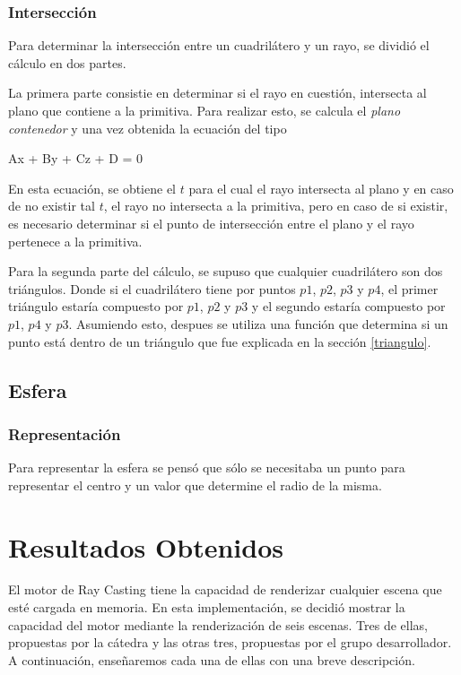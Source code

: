 \documentclass[a4paper,10pt]{article}
\begin{document}
\subsubsection{Intersecci\'on}
Para determinar la intersecci\'on entre un cuadril\'atero y un rayo, se dividi\'o el c\'alculo en dos partes.

La primera parte consistie en determinar si el rayo en cuesti\'on, intersecta al plano que contiene a la primitiva.  Para realizar esto, se calcula el \emph{plano contenedor} y una vez obtenida la ecuaci\'on del tipo

 \begin{center}
 Ax + By + Cz + D = 0
\end{center}

En esta ecuaci\'on, se obtiene el $t$ para el cual el rayo intersecta al plano y en caso de no existir tal $t$, el rayo no intersecta a la primitiva, pero en caso de si existir, es necesario determinar si el punto de intersecci\'on entre el plano y el rayo pertenece a la primitiva.

Para la segunda parte del c\'alculo, se supuso que cualquier cuadril\'atero son dos tri\'angulos.  Donde si el cuadril\'atero tiene por puntos $p1$, $p2$, $p3$ y $p4$, el primer tri\'angulo estar\'ia compuesto por $p1$, $p2$ y $p3$ y el segundo estar\'ia compuesto por $p1$, $p4$ y $p3$.
Asumiendo esto, despues se utiliza una funci\'on que determina si un punto est\'a dentro de un tri\'angulo que fue explicada en la secci\'on \ref{triangulo}.

\subsection{Esfera}

\subsubsection{Representaci\'on}

Para representar la esfera se pens\'o que s\'olo se necesitaba un punto para representar el centro y un valor que determine el radio de la misma.



\section{Resultados Obtenidos}
\label{escenas}
El motor de Ray Casting tiene la capacidad de renderizar cualquier escena que est\'e cargada en memoria.  En esta implementaci\'on, se decidi\'o mostrar la capacidad del motor mediante la renderizaci\'on de seis escenas.  Tres de ellas, propuestas por la c\'atedra y las otras tres, propuestas por el grupo desarrollador.  A continuaci\'on, ense\~naremos cada una de ellas con una breve descripci\'on.
\end{document}
